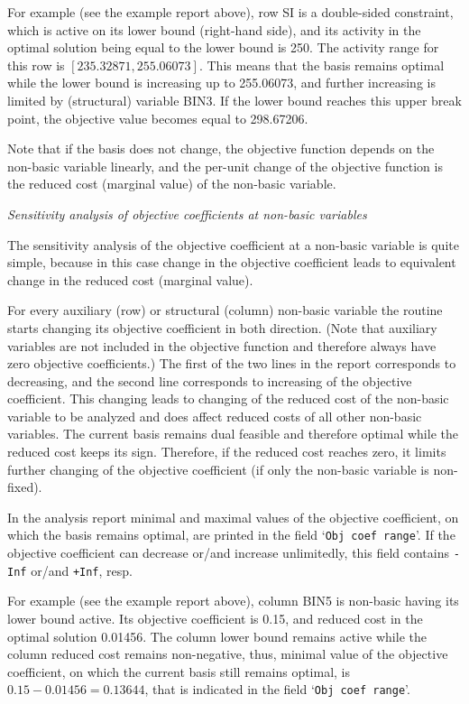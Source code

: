 For example (see the example report above), row SI is a double-sided
constraint, which is active on its lower bound (right-hand side), and
its activity in the optimal solution being equal to the lower bound is
250. The activity range for this row is $[235.32871,255.06073]$. This
means that the basis remains optimal while the lower bound is
increasing up to 255.06073, and further increasing is limited by
(structural) variable BIN3. If the lower bound reaches this upper break
point, the objective value becomes equal to 298.67206.

Note that if the basis does not change, the objective function depends
on the non-basic variable linearly, and the per-unit change of the
objective function is the reduced cost (marginal value) of the
non-basic variable.

\bigskip

\noindent
{\it Sensitivity analysis of objective coefficients at non-basic
variables}

\medskip

\noindent
The sensitivity analysis of the objective coefficient at a non-basic
variable is quite simple, because in this case change in the objective
coefficient leads to equivalent change in the reduced cost (marginal
value).

For every auxiliary (row) or structural (column) non-basic variable the
routine starts changing its objective coefficient in both direction.
(Note that auxiliary variables are not included in the objective
function and therefore always have zero objective coefficients.) The
first of the two lines in the report corresponds to decreasing, and the
second line corresponds to increasing of the objective coefficient.
This changing leads to changing of the reduced cost of the non-basic
variable to be analyzed and does affect reduced costs of all other
non-basic variables. The current basis remains dual feasible and
therefore optimal while the reduced cost keeps its sign. Therefore, if
the reduced cost reaches zero, it limits further changing of the
objective coefficient (if only the non-basic variable is non-fixed).

In the analysis report minimal and maximal values of the objective
coefficient, on which the basis remains optimal, are printed in the
field `\verb|Obj coef range|'. If the objective coefficient can
decrease or/and increase unlimitedly, this field contains {\tt -Inf}
or/and {\tt +Inf}, resp.

For example (see the example report above), column BIN5 is non-basic
having its lower bound active. Its objective coefficient is 0.15, and
reduced cost in the optimal solution 0.01456. The column lower bound
remains active while the column reduced cost remains non-negative,
thus, minimal value of the objective coefficient, on which the current
basis still remains optimal, is $0.15-0.01456=0.13644$, that is
indicated in the field `\verb|Obj coef range|'.

